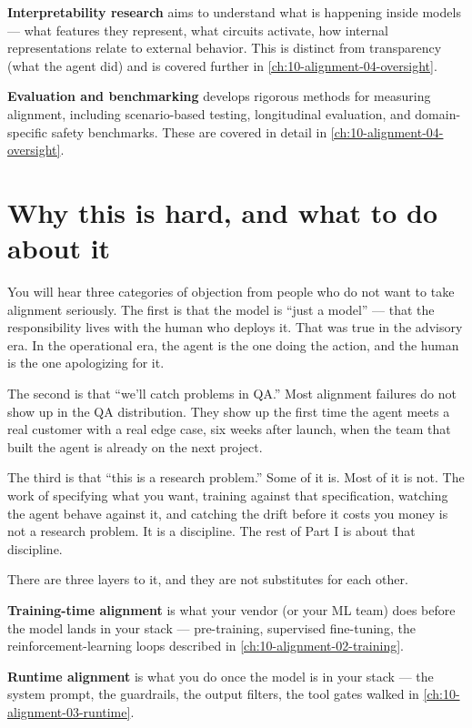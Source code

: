 \textbf{Interpretability research} aims to understand what is happening inside models --- what features they represent, what circuits activate, how internal representations relate to external behavior. This is distinct from transparency (what the agent did) and is covered further in \autoref{ch:10-alignment-04-oversight}.

\textbf{Evaluation and benchmarking} develops rigorous methods for measuring alignment, including scenario-based testing, longitudinal evaluation, and domain-specific safety benchmarks. These are covered in detail in \autoref{ch:10-alignment-04-oversight}.

\section{Why this is hard, and what to do about it}

You will hear three categories of objection from people who do not want to take alignment seriously. The first is that the model is ``just a model'' --- that the responsibility lives with the human who deploys it. That was true in the advisory era. In the operational era, the agent is the one doing the action, and the human is the one apologizing for it.

The second is that ``we'll catch problems in QA.'' Most alignment failures do not show up in the QA distribution. They show up the first time the agent meets a real customer with a real edge case, six weeks after launch, when the team that built the agent is already on the next project.

The third is that ``this is a research problem.'' Some of it is. Most of it is not. The work of specifying what you want, training against that specification, watching the agent behave against it, and catching the drift before it costs you money is not a research problem. It is a discipline. The rest of Part I is about that discipline.

There are three layers to it, and they are not substitutes for each other.

\textbf{Training-time alignment} is what your vendor (or your ML team) does before the model lands in your stack --- pre-training, supervised fine-tuning, the reinforcement-learning loops described in \autoref{ch:10-alignment-02-training}.

\textbf{Runtime alignment} is what you do once the model is in your stack --- the system prompt, the guardrails, the output filters, the tool gates walked in \autoref{ch:10-alignment-03-runtime}.

